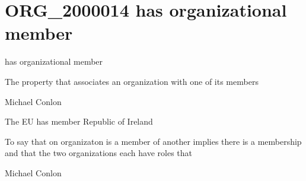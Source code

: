 \documentclass[letterpaper,10pt,english]{sphinxmanual}
\begin{document}
\section{ORG\_2000014 \sphinxhyphen{} has organizational member}
\label{\detokenize{doc-ORG_2000014:org-2000014-has-organizational-member}}\label{\detokenize{doc-ORG_2000014:index-0}}\label{\detokenize{doc-ORG_2000014::doc}}
\begin{sphinxShadowBox}

\sphinxAtStartPar
has organizational member
\end{sphinxShadowBox}

\begin{sphinxShadowBox}

\sphinxAtStartPar
The property that associates an organization with one of its members
\end{sphinxShadowBox}

\begin{sphinxShadowBox}

\sphinxAtStartPar
Michael Conlon 
\end{sphinxShadowBox}

\begin{sphinxShadowBox}

\sphinxAtStartPar
The EU has member Republic of Ireland
\end{sphinxShadowBox}

\begin{sphinxShadowBox}

\sphinxAtStartPar
To say that on organizaton is a member of another implies there is a membership and that the two organizations each have  roles that
\end{sphinxShadowBox}

\begin{sphinxShadowBox}

\sphinxAtStartPar
Michael Conlon 
\end{sphinxShadowBox}
\begin{quote}
\label{\detokenize{doc-ORG_2000015:org-2000015}}\label{\detokenize{doc-ORG_2000015:organizational-member-of}}\label{\detokenize{doc-ORG_2000015:org-2000015}}
\ignorespaces \end{quote}
\end{document}
